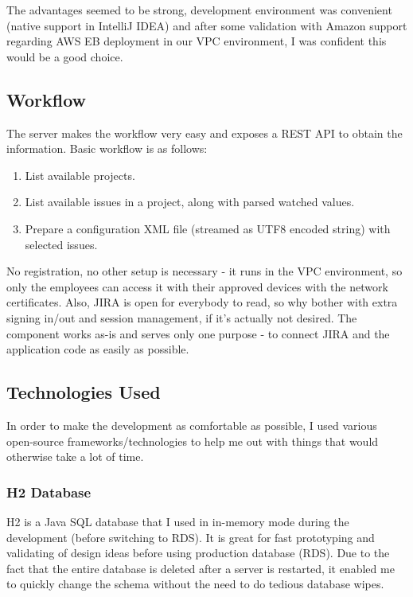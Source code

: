 The advantages seemed to be strong, development environment was convenient (native support in IntelliJ IDEA) and after some validation with Amazon support regarding AWS EB deployment in our VPC environment, I was confident this would be a good choice.

\subsection{Workflow}

The server makes the workflow very easy and exposes a REST API to obtain the information. Basic workflow is as follows:

\begin{enumerate}
	\item List available projects.
	\item List available issues in a project, along with parsed watched values.
	\item Prepare a configuration XML file (streamed as UTF8 encoded string) with selected issues.
\end{enumerate}

No registration, no other setup is necessary - it runs in the VPC environment, so only the employees can access it with their approved devices with the network certificates. Also, JIRA is open for everybody to read, so why bother with extra signing in/out and session management, if it's actually not desired. The component works as-is and serves only one purpose - to connect JIRA and the application code as easily as possible.

\newpage

\subsection{Technologies Used}

In order to make the development as comfortable as possible, I used various open-source frameworks/technologies to help me out with things that would otherwise take a lot of time.

\subsubsection{H2 Database}

H2 is a Java SQL database that I used in in-memory mode during the development (before switching to RDS). It is great for fast prototyping and validating of design ideas before using production database (RDS). Due to the fact that the entire database is deleted after a server is restarted, it enabled me to quickly change the schema without the need to do tedious database wipes. 

